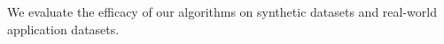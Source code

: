 We evaluate the efficacy of our algorithms on synthetic datasets and real-world application datasets.